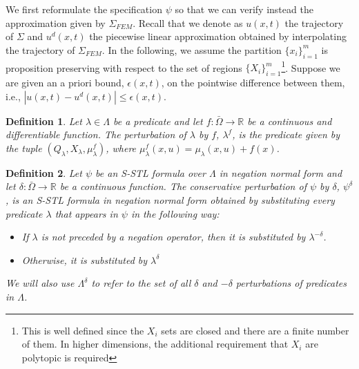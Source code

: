 \documentclass[letterpaper, 10 pt, conference]{ieeeconf/ieeeconf}
\newtheorem{definition}{Definition}
\newcommand*{\R}{\mathbb{R}}
\begin{document}
We first reformulate the specification $\psi$ so that we can verify instead the
approximation given by $\Sigma_{FEM}$. Recall that we denote as $u(x,t)$ the
trajectory of $\Sigma$ and $u^d(x, t)$ the piecewise linear approximation
obtained by interpolating the trajectory of $\Sigma_{FEM}$. In the following, we
assume the partition $\{x_i\}_{i=1}^m$ is proposition preserving with respect 
to the set of
regions $\{X_i\}_{i = 1}^{m}$\footnote{This is well defined since the $X_i$ sets are
closed and there are a finite number of them. In higher dimensions, the
additional requirement that $X_i$ are polytopic is required}. Suppose we are given
an a priori bound, $\epsilon(x, t)$, on the pointwise difference between them, i.e., 
$|u(x, t) - u^d(x, t)| \leq \epsilon(x, t)$.

\begin{definition}
\label{def:m_perturbation}
    Let $\lambda \in \Lambda$ be a predicate
    and let $f : \bar\Omega \to \R$ be a continuous and differentiable function. The perturbation of
    $\lambda$ by $f$, $\lambda^f$, is the predicate given by the tuple
    $(Q_\lambda, X_\lambda,
    \mu^f_\lambda)$, where $\mu^f_\lambda(x, u) = \mu_\lambda(x, u) + f(x)$.
\end{definition}

\begin{definition}
\label{def:delta_perturbation}
    Let $\psi$ be an S-STL formula over $\Lambda$ in negation normal form 
    and let $\delta : \bar\Omega \to \R$ be a continuous function. The
    conservative perturbation of $\psi$ by $\delta$, $\psi^\delta$, is an S-STL
    formula in negation normal form obtained by substituting every predicate
    $\lambda$ that appears in $\psi$ in the following way:

    \begin{itemize}
        \item If $\lambda$ is not preceded by a negation operator, then it is
            substituted by $\lambda^{-\delta}$.
        \item Otherwise, it is substituted by $\lambda^{\delta}$
    \end{itemize}

    We will also use $\Lambda^{\delta}$ to refer to the set of all $\delta$ and
    $-\delta$
    perturbations of predicates in $\Lambda$.
\end{definition}
\end{document}
